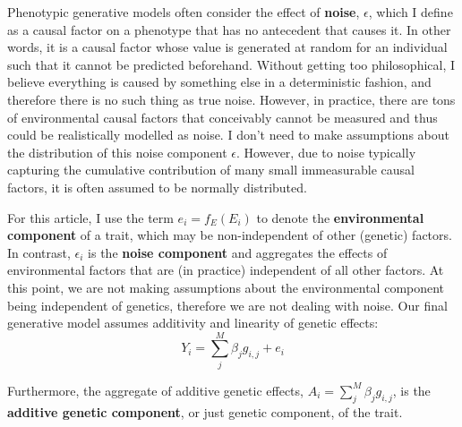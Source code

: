 \documentclass[12pt]{article}
\begin{document}
Phenotypic generative models often consider the effect of \textbf{noise}, $\epsilon$, which I define as a causal factor on a phenotype that has no antecedent that causes it.
In other words, it is a causal factor whose value is generated at random for an individual such that it cannot be predicted beforehand.
Without getting too philosophical, I believe everything is caused by something else in a deterministic fashion, and therefore there is no such thing as true noise.
However, in practice, there are tons of environmental causal factors that conceivably cannot be measured and thus could be realistically modelled as noise.
I don't need to make assumptions about the distribution of this noise component $\epsilon$.
However, due to noise typically capturing the cumulative contribution of many small immeasurable causal factors, it is often assumed to be normally distributed.

For this article, I use the term $e_i = f_E(E_i)$ to denote the \textbf{environmental component} of a trait, which may be non-independent of other (genetic) factors.
In contrast, $\epsilon_i$ is the \textbf{noise component} and aggregates the effects of environmental factors that are (in practice) independent of all other factors.
At this point, we are not making assumptions about the environmental component being independent of genetics, therefore we are not dealing with noise. Our final generative model assumes additivity and linearity of genetic effects:
$$ Y_i = \sum_j^M \beta_j g_{i,j} + e_i $$

Furthermore, the aggregate of additive genetic effects, $A_i = \sum_j^M \beta_j g_{i,j}$, is the \textbf{additive genetic component}, or just genetic component, of the trait.
\end{document}

